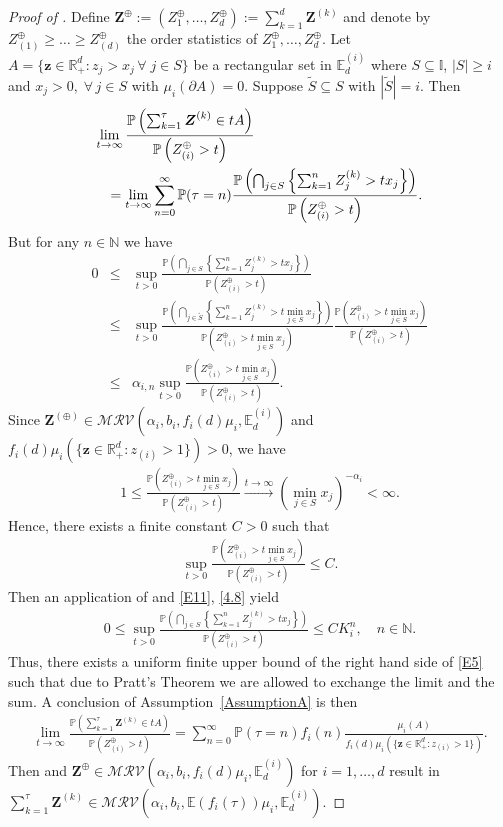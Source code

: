 \documentclass[aos]{imsart}
\numberwithin{equation}{section}
\theoremstyle{plain} %
\theoremstyle{remark}
\newcommand{\beao}{\begin{eqnarray*}}
\newcommand{\eeao}{\end{eqnarray*}\noindent}
\newcommand{\beam}{\begin{eqnarray}}
\newcommand{\eeam}{\end{eqnarray}\noindent}
\newcommand{\E}{\mathbb{E}}
\newcommand{\N}{\mathbb{N}}
\renewcommand\P{\mathbb{P}}
\newcommand{\R}{\mathbb{R}}
\def\MRV{\mathcal{MRV}}
\def\bZ{\boldsymbol Z}
\def\bz{\boldsymbol z}
\begin{document}
\begin{proof}[Proof of ]
Define $\bZ^{\oplus}:=(Z^{\oplus}_1,\ldots, Z^{\oplus}_d):=\sum_{k=1}^{d}\bZ^{(k)}$ and denote by  
$Z^{\oplus}_{(1)}\geq \ldots \geq Z^{\oplus}_{(d)}$
 the order statistics of
$Z^{\oplus}_1,\ldots, Z^{\oplus}_d$.
Let  $A= \{\bz \in \R_+^d: z_j>x_j \,\forall\; j\in S\}$ be a rectangular set in $\E_d^{(i)}$  where $S\subseteq \mathbb{I}$, $|S|\geq i$ and $x_j>0,\; \forall\, j\in S$ with $\mu_i(\partial A)=0$. Suppose $\widetilde S\subseteq S$ with $|\widetilde S|=i$. Then
\beam \label{E5}
    \lefteqn{\lim_{t\to\infty}\frac{\P\left(\sum_{k=1}^{\tau}\bZ^{(k)}\in tA\right)}{\P\left(Z_{(i)}^{\oplus}>t\right)}} \nonumber\\
        &&=\lim_{t\to\infty}\sum_{n=0}^{\infty}\P(\tau=n)
        \frac{\P\left(\bigcap_{j\in S}\left\{\sum_{k=1}^nZ_{j}^{(k)}>tx_{j}\right\}\right)}{
        \P\left(Z_{(i)}^{\oplus}>t\right)}.
\eeam
But for any $n\in\N$ we have
\beam  \label{E11}
    0&\leq& \sup_{t>0}\frac{\P\left(\bigcap_{j\in S}\left\{\sum_{k=1}^nZ_{j}^{(k)}>tx_{j}\right\}\right)}{
        \P\left(Z_{(i)}^{\oplus}>t\right)} \nonumber\\
    &\leq& \sup_{t>0}\frac{\P\left(\bigcap_{j\in \widetilde S}\left\{\sum_{k=1}^nZ_{j}^{(k)}>t\min_{j\in S}x_{j}\right\}\right)}{
        \P\left(Z_{(i)}^{\oplus}>t\min_{j\in S} x_{j}\right)}
        \frac{        \P\left(Z_{(i)}^{\oplus}>t\min_{j\in S} x_{j}\right)}{
        \P\left(Z_{(i)}^{\oplus}>t\right)}\nonumber \\
    &\leq& \alpha_{i,n} \sup_{t>0}\frac{\P\left(Z_{(i)}^{\oplus}>t\min_{j\in S} x_{j}\right)}{
        \P\left(Z_{(i)}^{\oplus}>t\right)}.
\eeam
Since $\bZ^{(\oplus)}\in\MRV(\alpha_i,b_i,f_i(d)\mu_i,\E_d^{(i)})$ and $f_i(d)\mu_i\left(\{\bz\in\R_+^d:z_{(i)}> 1\}\right)>0$, we have
\beao
    1\leq  \frac{\P\left(Z_{(i)}^{\oplus}>t\min_{j\in S} x_{j}\right)}{
        \P\left(Z_{(i)}^{\oplus}>t\right)}\stackrel{t\to\infty}{\to}
        \left(\min_{j\in S} x_{j}\right)^{-\alpha_i}<\infty.
\eeao
Hence, there exists a finite constant $C>0$ such that
\beam \label{4.8}
    \sup_{t>0}\frac{\P\left(Z_{(i)}^{\oplus}>t\min_{j\in S} x_{j}\right)}{
        \P\left(Z_{(i)}^{\oplus}>t\right)}\leq C.
\eeam
Then an application of  and \eqref{E11}, \eqref{4.8} yield
\beao
    0\leq \sup_{t>0}\frac{\P\left(\bigcap_{j\in S}\left\{\sum_{k=1}^nZ_{j}^{(k)}>tx_{j}\right\}\right)}{
        \P\left(Z_{(i)}^{\oplus}>t\right)}\leq  CK_i^n, \quad n\in\N.
\eeao
Thus, there exists a uniform finite upper bound of the right hand side of \eqref{E5}
such that due to Pratt's Theorem
we are allowed to exchange the limit and the sum. A conclusion of Assumption~\ref{AssumptionA}
is then
\beao
    \lim_{t\to\infty}\frac{\P\left(\sum_{k=1}^{\tau}\bZ^{(k)}\in tA\right)}{\P\left(Z_{(i)}^{\oplus}>t\right)}
    =\sum_{n=0}^{\infty}\P(\tau=n)f_i(n)\frac{\mu_i(A)}{f_i(d)\mu_i\left(\{\bz\in\R_+^d:z_{(i)}> 1\}\right)}.
\eeao
Then  and $\bZ^{\oplus}\in\MRV(\alpha_i,b_i,f_i(d)\mu_i,\E_d^{(i)})$ for $i=1,\ldots,d$ result in $\sum_{k=1}^{\tau}\bZ^{(k)}\in \MRV(\alpha_i,b_i,\E(f_i(\tau))\mu_i,\E_d^{(i)})$.
\end{proof}
\newpage
\end{document}
